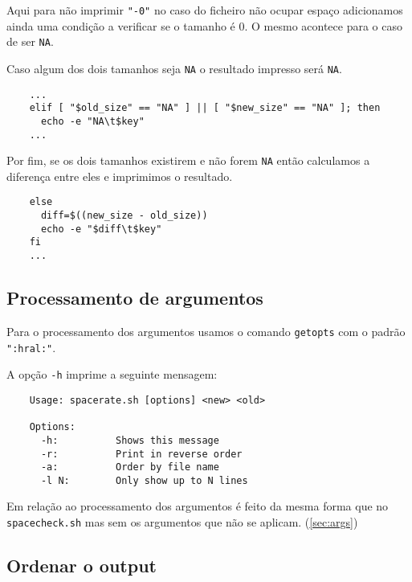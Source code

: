 Aqui para não imprimir \Verb|"-0"| no caso do ficheiro não ocupar espaço adicionamos ainda uma condição a verificar se o tamanho é 0.
O mesmo acontece para o caso de ser \Verb|NA|.

Caso algum dos dois tamanhos seja \Verb|NA| o resultado impresso será \Verb|NA|.

\begin{listing}[H]
  \begin{verbatim}
    ...
    elif [ "$old_size" == "NA" ] || [ "$new_size" == "NA" ]; then
      echo -e "NA\t$key"
    ...
  \end{verbatim}
\end{listing}

Por fim, se os dois tamanhos existirem e não forem \Verb|NA| então calculamos a diferença entre eles e imprimimos o resultado.

\begin{listing}[H]
  \begin{verbatim}
    else
      diff=$((new_size - old_size))
      echo -e "$diff\t$key"
    fi
    ...
  \end{verbatim}
\end{listing}

\subsection{Processamento de argumentos}

Para o processamento dos argumentos usamos o comando \texttt{getopts} com o padrão \texttt{":hral:"}.

A opção \Verb|-h| imprime a seguinte mensagem:

\begin{listing}[H]
  \begin{verbatim}
    Usage: spacerate.sh [options] <new> <old>

    Options:
      -h:          Shows this message
      -r:          Print in reverse order
      -a:          Order by file name
      -l N:        Only show up to N lines
  \end{verbatim}
\end{listing}

Em relação ao processamento dos argumentos é feito da mesma forma que no \texttt{spacecheck.sh} mas sem os argumentos que não se aplicam. (\ref{sec:args})

\subsection{Ordenar o output}

